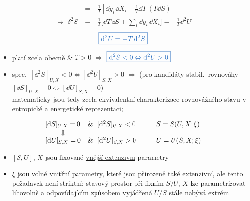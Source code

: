 \begin{align*}
  \phantom{\delta^2S} &= -\frac1T\left[\dd y_i\,\dd X_i + \frac1T\dd T\,(T\dd S)\right] \\
  \Rightarrow\ \delta^2S &= -\frac1T\Big[\dd T\,\dd S + \sum_i\dd y_i\,\dd X_i\Big] = -\frac1T\dd^2U
\end{align*}
\[
  \textcolor{NavyBlue}{\boxed{\dd^2U = -T\,\dd^2S}}
\]
\begin{itemize}
  \item platí zcela obecně \& $T > 0$ $\Rightarrow$ \qquad
  $\textcolor{NavyBlue}{\boxed{\dd^2S < 0 \Leftrightarrow \dd^2U > 0}}$
  \item spec.\ \checkmark \quad $[\dd^2S]_{U,X} < 0 \Leftrightarrow [\dd^2U]_{S,X} > 0$ \quad $\Rightarrow$
  \textcolor{NavyBlue}{\small (pro kandidáty stabil.\ rovnováhy $[\dd S]_{U,X} = 0 \Leftrightarrow [\dd U]_{S,X} = 0$)} \\
  matematicky jsou tedy zcela ekvivalentní charakterizace rovnovážného stavu v entropické a energetické reprezentaci;
\end{itemize}

\begin{veta}
\[
  \begin{array}{lll}
    {}[\dd S]_{U,X} = 0 & \&\ \ [\dd^2S]_{U,X} < 0 & \qquad S = S(U,X;\xi) \\
    \multicolumn{1}{c}{\Updownarrow} & & \\
    {}[\dd U]_{S,X} = 0 & \&\ \ [\dd^2U]_{S,X} > 0 & \qquad U = U(S,X;\xi)
  \end{array}
\]
\end{veta}
\begin{itemize}
  \item $[S,U]$, $X$ jsou fixované \underline{vnější extenzivní} parametry
  \item $\xi$ jsou volné vnitřní parametry, které jsou přirozeně také extenzivní, ale tento požadavek není striktní; stavový prostor při fixním $S/U$, $X$ lze parametrizovat libovolně a odpovídajícím způsobem vyjádřená $U/S$ stále nabývá extrém
\end{itemize}

